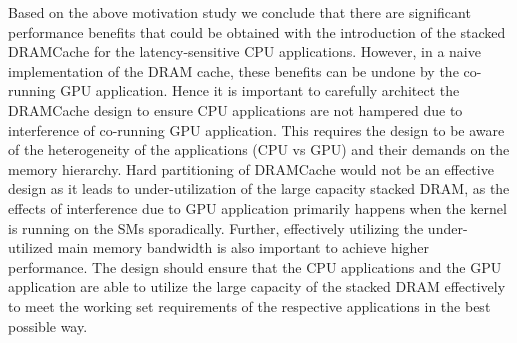 
Based on the above motivation study we conclude that there are significant performance benefits that could be obtained 
with the introduction of the stacked DRAMCache for the latency-sensitive CPU applications. However, in a naive implementation
of the DRAM cache, these benefits can be undone by the co-running GPU application.  Hence it is important to carefully 
architect the DRAMCache design to ensure CPU applications are not hampered due to interference of co-running GPU application.
This requires the design to be aware of the heterogeneity of the applications (CPU vs GPU) and their demands on the 
memory hierarchy.  Hard partitioning of DRAMCache would not be an effective design as it leads to under-utilization of the large capacity 
stacked DRAM, as the effects of interference due to GPU application primarily happens when the kernel is running on the SMs sporadically. 
Further, effectively utilizing the under-utilized main memory bandwidth \cite{micro-refresh, mainak-hpca}
is also important to achieve higher performance.  The design should ensure that the CPU applications and the 
GPU application are able to utilize the large capacity of the stacked DRAM effectively to meet the working set 
requirements of the respective applications in the best possible way.
